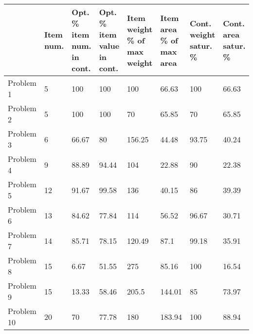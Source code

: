 \begin{tabular}{llllllll}
\toprule
{} & Item num. & Opt. \% item num. in cont. & Opt. \% item value in cont. & Item weight \% of max weight & Item area \% of max area & Cont. weight satur. \% & Cont. area satur. \% \\
\midrule
Problem 1           &         5 &                       100 &                        100 &                         100 &                   66.63 &                   100 &               66.63 \\
Problem 2           &         5 &                       100 &                        100 &                          70 &                   65.85 &                    70 &               65.85 \\
Problem 3           &         6 &                     66.67 &                         80 &                      156.25 &                   44.48 &                 93.75 &               40.24 \\
Problem 4           &         9 &                     88.89 &                      94.44 &                         104 &                   22.88 &                    90 &               22.38 \\
Problem 5           &        12 &                     91.67 &                      99.58 &                         136 &                   40.15 &                    86 &               39.39 \\
Problem 6           &        13 &                     84.62 &                      77.84 &                         114 &                   56.52 &                 96.67 &               30.71 \\
Problem 7           &        14 &                     85.71 &                      78.15 &                      120.49 &                    87.1 &                 99.18 &               35.91 \\
Problem 8           &        15 &                      6.67 &                      51.55 &                         275 &                   85.16 &                   100 &               16.54 \\
Problem 9           &        15 &                     13.33 &                      58.46 &                       205.5 &                  144.01 &                    85 &               73.97 \\
Problem 10          &        20 &                        70 &                      77.78 &                         180 &                  183.94 &                   100 &               88.94 \\

\end{tabular}
